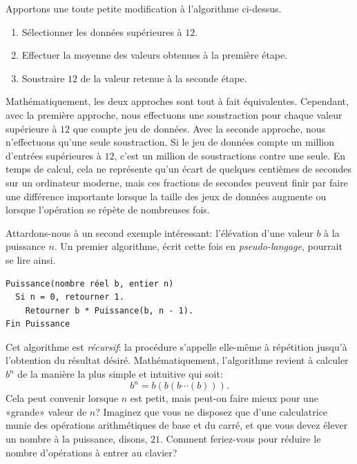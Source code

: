 Apportons une toute petite modification à l'algorithme ci-dessus.

\begin{Schunk}
  \begin{enumerate}
  \item Sélectionner les données supérieures à $12$.
  \item Effectuer la moyenne des valeurs obtenues à la première étape.
  \item Soustraire $12$ de la valeur retenue à la seconde étape.
  \end{enumerate}
\end{Schunk}

Mathématiquement, les deux approches sont tout à fait équivalentes.
Cependant, avec la première approche, nous effectuons une soustraction
pour chaque valeur supérieure à $12$ que compte jeu de données. Avec
la seconde approche, nous n'effectuons qu'une seule soustraction. Si
le jeu de données compte un million d'entrées supérieures à $12$,
c'est un million de soustractions contre une seule. En temps de
calcul, cela ne représente qu'un écart de quelques centièmes de
secondes sur un ordinateur moderne, mais ces fractions de secondes
peuvent finir par faire une différence importante lorsque la taille
des jeux de données augmente ou lorsque l'opération se répète de
nombreuses fois.

Attardons-nous à un second exemple intéressant: l'élévation d'une
valeur $b$ à la puissance $n$. Un premier algorithme, écrit cette fois
en \emph{pseudo-langage}, pourrait se lire
ainsi.

\begin{Schunk}
\begin{Verbatim}
Puissance(nombre réel b, entier n)
  Si n = 0, retourner 1.
    Retourner b * Puissance(b, n - 1).
Fin Puissance
\end{Verbatim}
\end{Schunk}

Cet algorithme est \emph{récursif}: la
procédure  s'appelle elle-même à répétition jusqu'à
l'obtention du résultat désiré. Mathématiquement, l'algorithme revient
à calculer $b^n$ de la manière la plus simple et intuitive qui soit:
\begin{equation*}
  b^n = b (b (b \cdots (b))).
\end{equation*}
Cela peut convenir lorsque $n$ est petit, mais peut-on faire mieux
pour une «grande» valeur de $n$? Imaginez que vous ne disposez que
d'une calculatrice munie des opérations arithmétiques de base et du
carré, et que vous devez élever un nombre à la puissance, disons,
$21$. Comment feriez-vous pour réduire le nombre d'opérations à entrer
au clavier?

